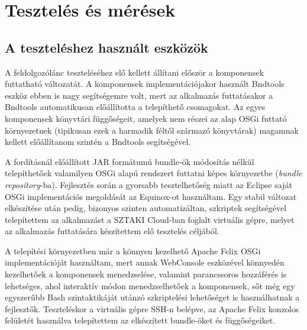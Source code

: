 \chapter{Tesztelés és mérések}
\label{cha:test}

\section{A teszteléshez használt eszközök}
\label{sec:testtools}

A feldolgozólánc teszteléséhez elő kellett állítani először a komponensek futtatható változatát. A komponensek implementációjakor használt Bndtools eszköz ebben is nagy segítségemre volt, mert az alkalmazás futtatásakor a Bndtools automatikusan előállította a telepíthető csomagokat. Az egyes komponensek könyvtári függőségeit, amelyek nem részei az alap OSGi futtató környezetnek (tipikusan ezek a harmadik féltől származó könyvtárak) magamnak kellett előállítanom szintén a Bndtools segítségével.

A fordításnál előállított JAR formátumú bundle-ök módosítás nélkül telepíthetőek valamilyen OSGi alapú rendszert futtatni képes környezetbe (\textit{bundle repository}-ba). Fejlesztés során a gyorsabb tesztelhetőség miatt az Eclipse saját OSGi implementációs megoldását az Equinox-ot használtam. Egy stabil változat elkészítése után pedig, bizonyos szinten automatizáltan, szkriptek segítségével telepítettem az alkalmazást a SZTAKI Cloud-ban foglalt virtuális gépre, melyet az alkalmazás futtatására készítettem elő tesztelés céljából.

A telepítési környezetben már a könnyen kezelhető Apache Felix \cite{apachefelix} OSGi implementációját használtam, mert annak WebConsole eszközével könnyedén kezelhetőek a komponensek menedzselése, valamint parancssoros hozzáférés is lehetséges, ahol interaktív módon menedzselhetőek a komponensek, sőt még egy egyszerűbb Bash szintaktikáját utánzó szkriptelési lehetőséget is használhatnak a fejlesztők. Teszteléskor a virtuális gépre SSH-n belépve, az Apache Felix konzolos felületét használva telepítettem az elkészített bundle-öket és függőségeiket.

